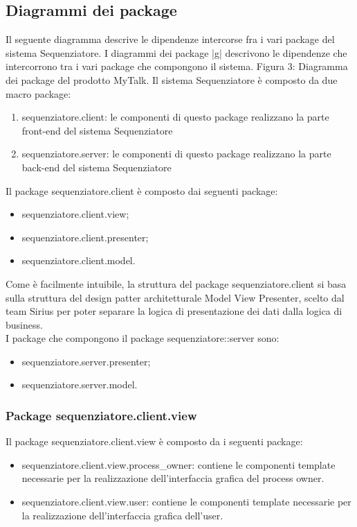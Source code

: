\subsection{Diagrammi dei package}
Il seguente diagramma descrive le dipendenze intercorse fra i vari package del sistema Sequenziatore.
I diagrammi dei package |g| descrivono le dipendenze che intercorrono tra i vari
package che compongono il sistema.
Figura 3: Diagramma dei package del prodotto MyTalk.
Il sistema Sequenziatore è composto da due macro package:
\begin{enumerate}
	\item sequenziatore.client: le componenti di questo package realizzano la parte front-end del sistema Sequenziatore 
	\item sequenziatore.server: le componenti di questo package realizzano la parte back-end del sistema Sequenziatore 
\end{enumerate}
Il package sequenziatore.client è composto dai seguenti package:
\begin{itemize}
	\item sequenziatore.client.view;
	\item sequenziatore.client.presenter;
	\item sequenziatore.client.model.
\end{itemize}
Come è facilmente intuibile, la struttura del package sequenziatore.client si basa sulla struttura del design patter
architetturale Model View Presenter, scelto dal team Sirius per poter separare la logica di presentazione dei dati dalla logica di business.\\
I package che compongono il package sequenziatore::server sono:
\begin{itemize}
	\item sequenziatore.server.presenter;
	\item sequenziatore.server.model.
\end{itemize}
\subsubsection{Package sequenziatore.client.view}
Il package sequenziatore.client.view è composto da i seguenti package:
\begin{itemize}
	\item sequenziatore.client.view.process_owner: contiene le componenti template necessarie per la realizzazione dell’interfaccia grafica del process owner.
	\item sequenziatore.client.view.user: contiene le componenti template necessarie per la realizzazione dell’interfaccia grafica dell'user.
\end{itemize}

